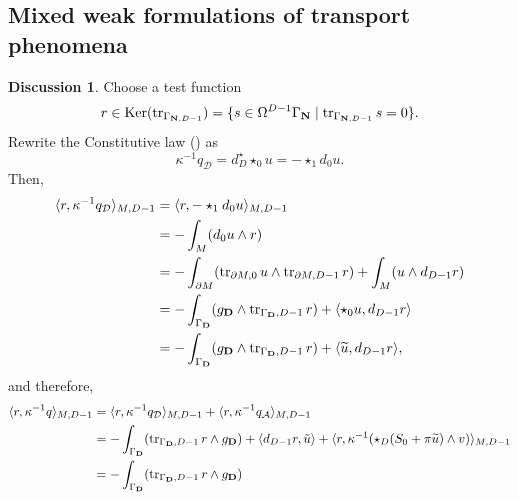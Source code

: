 \documentclass{elsarticle}
\theoremstyle{definition}
\newtheorem{discussion}[theorem]{Discussion}
\newcommand{\inner}[2]{\langle#1,#2\rangle}
\newcommand{\tr}{\mathop{\rm tr}\nolimits}
\newcommand{\Ker}{\mathop{\rm Ker}\nolimits}
\newcommand{\set}[2]{\{#1 \mid #2\}}
\newcommand{\diffusive}{\mathcal{D}}
\newcommand{\advective}{\mathcal{A}}
\newcommand{\Dirichlet}{\mathbf{D}}
\newcommand{\Neumann}{\mathbf{N}}
\begin{document}
\subsection{Mixed weak formulations of transport phenomena}
\label{sec:continuum/mixed}

\begin{discussion}
  Choose a test function
  \begin{equation}
    r \in \Ker(\tr_{\Gamma_{\Neumann, D - 1}}) = \set{s \in \Omega^{D - 1} \Gamma_{\Neumann}}{\tr_{\Gamma_{\Neumann, D - 1}} s = 0}.
  \end{equation}
  Rewrite the Constitutive law () as
  \begin{equation}
    \kappa^{-1} q_{\diffusive}
    = d^\star_D \star_0 u
    = -\star_1 d_0 u.
  \end{equation}
  Then,
  \begin{equation}
    \label{eq:continuum/mixed_weak/constitutive_law_calculations}
    \begin{split}
      \inner{r}{\kappa^{-1} q_{\diffusive}}_{M, D - 1}
      & = \inner{r}{-\star_1 d_0 u}_{M, D - 1} \\
      & = - \int_M (d_0 u \wedge r) \\
      & = - \int_{\partial M}
        (\tr_{\partial M, 0} u \wedge \tr_{\partial M, D - 1} r )
        + \int_M (u \wedge d_{D - 1} r) \\
      & = - \int_{\Gamma_{\Dirichlet}} (g_{\Dirichlet} \wedge \tr_{\Gamma_{\Dirichlet}, D - 1} r )
        + \inner{\star_0 u}{d_{D - 1} r} \\
      & = - \int_{\Gamma_{\Dirichlet}} (g_{\Dirichlet} \wedge \tr_{\Gamma_{\Dirichlet}, D - 1} r)
        + \inner{\widetilde{u}}{d_{D - 1} r},
    \end{split}
  \end{equation}
  and therefore,
  \begin{equation}
    \label{eq:continuum/mixed_weak/constitutive_law}
    \begin{split}
      \inner{r}{\kappa^{-1} q}_{M, D - 1}
      & = \inner{r}{\kappa^{-1} q_{\diffusive}}_{M, D - 1}
        + \inner{r}{\kappa^{-1} q_{\advective}}_{M, D - 1} \\
      & = -\int_{\Gamma_{\Dirichlet}} (\tr_{\Gamma_{\Dirichlet}, D - 1} r \wedge g_{\Dirichlet})
        + \inner{d_{D - 1} r}{\tilde{u}}
        + \inner{r}{\kappa^{-1} (\star_D (S_0 + \pi \widetilde{u}) \wedge v)}_{M, D - 1} \\
      & = -\int_{\Gamma_{\Dirichlet}} (\tr_{\Gamma_{\Dirichlet}, D - 1} r \wedge g_{\Dirichlet})

\end{split}
\end{equation}
\end{discussion}
\end{document}
